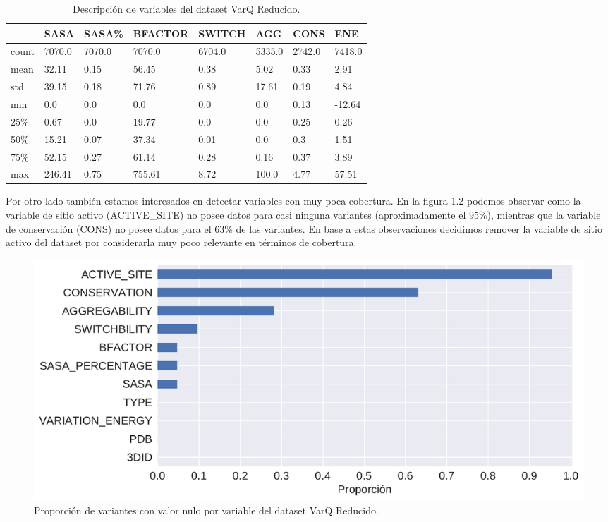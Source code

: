 \begin{table}[H]
\centering
\begin{tabular}{|l|l|l|l|l|l|l|l|}
\hline
 & SASA & SASA\% & BFACTOR & SWITCH & AGG & CONS & ENE \\ \hline
count & 7070.0 & 7070.0 & 7070.0 & 6704.0 & 5335.0 & 2742.0 & 7418.0 \\ \hline
mean & 32.11 & 0.15 & 56.45 & 0.38 & 5.02 & 0.33 & 2.91 \\ \hline
std & 39.15 & 0.18 & 71.76 & 0.89 & 17.61 & 0.19 & 4.84 \\ \hline
min & 0.0 & 0.0 & 0.0 & 0.0 & 0.0 & 0.13 & -12.64 \\ \hline
25\% & 0.67 & 0.0 & 19.77 & 0.0 & 0.0 & 0.25 & 0.26 \\ \hline
50\% & 15.21 & 0.07 & 37.34 & 0.01 & 0.0 & 0.3 & 1.51 \\ \hline
75\% & 52.15 & 0.27 & 61.14 & 0.28 & 0.16 & 0.37 & 3.89 \\ \hline
max & 246.41 & 0.75 & 755.61 & 8.72 & 100.0 & 4.77 & 57.51 \\ \hline
\end{tabular}
\caption{Descripción de variables del dataset VarQ Reducido.}
\end{table}

Por otro lado también estamos interesados en detectar variables con muy poca cobertura. En la figura 1.2 podemos observar como la variable de sitio activo (ACTIVE\_SITE) no posee datos para casi ninguna variantes (aproximadamente el 95\%), mientras que la variable de conservación (CONS) no posee datos para el 63\% de las variantes. En base a estas observaciones decidimos remover la variable de sitio activo del dataset por considerarla muy poco relevante en términos de cobertura.

\begin{figure}[H]
    \centering
    \includegraphics[scale=0.55]{documents/latex/figures/3/proporcion_nulos.pdf}
    \caption{Proporción de variantes con valor nulo por variable del dataset VarQ Reducido.}
    \label{fig:proporcion_nulos_varq}
\end{figure}

